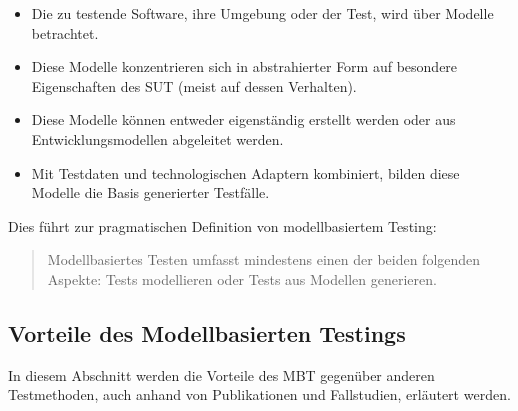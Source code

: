 \begin{itemize}
\item Die zu testende Software, ihre Umgebung oder der Test, wird über Modelle betrachtet.
\item Diese Modelle konzentrieren sich in abstrahierter Form auf besondere Eigenschaften des \Gls{SUT} (meist auf dessen Verhalten).
\item Diese Modelle können entweder eigenständig erstellt werden oder aus Entwicklungsmodellen abgeleitet werden.
\item Mit Testdaten und technologischen Adaptern kombiniert, bilden diese Modelle die Basis generierter Testfälle.
\end{itemize}

Dies führt zur pragmatischen Definition von modellbasiertem Testing:

\begin{quote}
Modellbasiertes Testen umfasst mindestens einen der beiden folgenden Aspekte: Tests modellieren oder Tests aus Modellen generieren.
\end{quote}

\subsection{Vorteile des Modellbasierten Testings}

\label{sec:mbt_vorteile}
In diesem Abschnitt werden die Vorteile des \Gls{MBT} gegenüber anderen Testmethoden, auch anhand von Publikationen und Fallstudien, erläutert werden.


